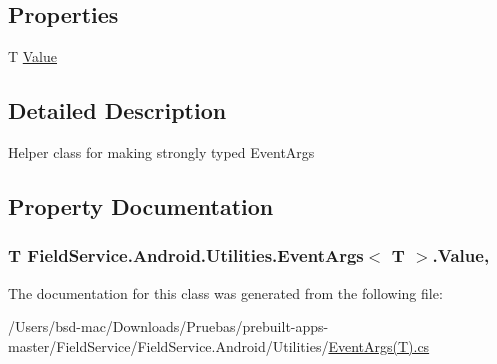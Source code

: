 \subsection*{Properties}
\begin{DoxyCompactItemize}
\item 
T \hyperlink{class_field_service_1_1_android_1_1_utilities_1_1_event_args_3_01_t_01_4_ac896a137b772fe5e0ad01abc035cdb8f}{Value}
\end{DoxyCompactItemize}


\subsection{Detailed Description}
Helper class for making strongly typed Event\+Args 



\subsection{Property Documentation}
\hypertarget{class_field_service_1_1_android_1_1_utilities_1_1_event_args_3_01_t_01_4_ac896a137b772fe5e0ad01abc035cdb8f}{
\subsubsection[{Value}]{\setlength{\rightskip}{0pt plus 5cm}T Field\+Service.\+Android.\+Utilities.\+Event\+Args$<$ T $>$.Value\hspace{0.3cm}{\ttfamily [get]}, {\ttfamily [set]}}}\label{class_field_service_1_1_android_1_1_utilities_1_1_event_args_3_01_t_01_4_ac896a137b772fe5e0ad01abc035cdb8f}


The documentation for this class was generated from the following file\+:\begin{DoxyCompactItemize}
\item 
/\+Users/bsd-\/mac/\+Downloads/\+Pruebas/prebuilt-\/apps-\/master/\+Field\+Service/\+Field\+Service.\+Android/\+Utilities/\hyperlink{_event_args_07_t_08_8cs}{Event\+Args(\+T).\+cs}\end{DoxyCompactItemize}
